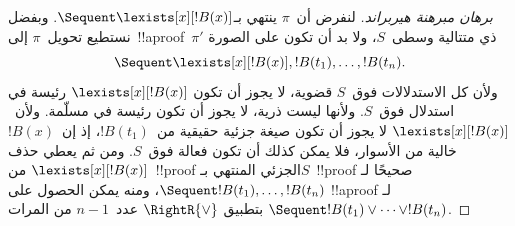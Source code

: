 \documentclass[../../../include/open-logic-section]{subfiles}
\begin{document}
\begin{proof}[برهان مبرهنة هيربراند]
لنفرض أن~$\pi$ ينتهي بـ$\Sequent \lexists[x][!B(x)]$. وبفضل
 نستطيع تحويل~$\pi$ إلى~!!a{proof}~$\pi'$ ذي
متتالية وسطى~$S$، ولا بد أن تكون على الصورة
\[
\Sequent \lexists[x][!B(x)], !B(t_1), \dots, !B(t_n).
\]
ولأن كل الاستدلالات فوق~$S$ قضوية، لا يجوز أن تكون
$\lexists[x][!B(x)]$ رئيسة في استدلال فوق~$S$. ولأنها ليست ذرية، لا
يجوز أن تكون رئيسة في مسلّمة. ولأن~$\lexists[x][!B(x)]$ لا يجوز أن تكون
صيغة جزئية حقيقية من~$!B(t_1)$، إذ إن~$!B(x)$ خالية من الأسوار، فلا
يمكن كذلك أن تكون فعالة فوق~$S$. ومن ثم يعطي حذف
$\lexists[x][!B(x)]$ من~!!{proof} الجزئي المنتهي بـ$S$~!!{proof}
صحيحًا لـ$\Sequent !B(t_1), \dots, !B(t_n)$، ومنه يمكن الحصول على
!!a{proof} لـ$\Sequent !B(t_1) \lor \dots \lor !B(t_n)$ بتطبيق
$\RightR{\lor}$ عدد~$n-1$ من المرات.
\end{proof}

\end{document}
